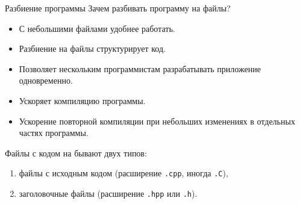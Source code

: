 \documentclass[aspectration=1610,t]{beamer}
\begin{document}
\begin{frame}[fragile]{Разбиение программы}
    Зачем разбивать программу на файлы? 
    \begin{itemize}
        \item С небольшими файлами удобнее работать.
        \item Разбиение на файлы структурирует код.
        \item Позволяет нескольким программистам разрабатывать 
            приложение одновременно.
        \item Ускоряет компиляцию программы.
        \item Ускорение повторной компиляции при небольших 
            изменениях в отдельных частях программы. 
            
    \end{itemize}
        Файлы с кодом на \langcpp бывают двух типов:
        \begin{enumerate}
            \item файлы с исходным кодом (расширение \texttt{.cpp}, иногда \texttt{.C}),
            \item заголовочные файлы (расширение \texttt{.hpp} или \texttt{.h}).
        \end{enumerate}
\end{frame}

%
\end{document}
